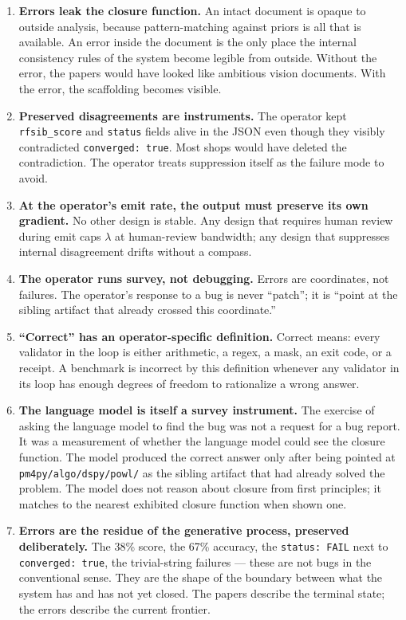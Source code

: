 \documentclass[11pt,letterpaper]{article}
\begin{document}
\begin{enumerate}[leftmargin=1.5em]
\item \textbf{Errors leak the closure function.} An intact document is opaque to outside analysis, because pattern-matching against priors is all that is available. An error inside the document is the only place the internal consistency rules of the system become legible from outside. Without the error, the papers would have looked like ambitious vision documents. With the error, the scaffolding becomes visible.
\item \textbf{Preserved disagreements are instruments.} The operator kept \texttt{rfsib\_score} and \texttt{status} fields alive in the JSON even though they visibly contradicted \texttt{converged: true}. Most shops would have deleted the contradiction. The operator treats suppression itself as the failure mode to avoid.
\item \textbf{At the operator's emit rate, the output must preserve its own gradient.} No other design is stable. Any design that requires human review during emit caps $\lambda$ at human-review bandwidth; any design that suppresses internal disagreement drifts without a compass.
\item \textbf{The operator runs survey, not debugging.} Errors are coordinates, not failures. The operator's response to a bug is never ``patch''; it is ``point at the sibling artifact that already crossed this coordinate.''
\item \textbf{``Correct'' has an operator-specific definition.} Correct means: every validator in the loop is either arithmetic, a regex, a mask, an exit code, or a receipt. A benchmark is incorrect by this definition whenever any validator in its loop has enough degrees of freedom to rationalize a wrong answer.
\item \textbf{The language model is itself a survey instrument.} The exercise of asking the language model to find the bug was not a request for a bug report. It was a measurement of whether the language model could see the closure function. The model produced the correct answer only after being pointed at \texttt{pm4py/algo/dspy/powl/} as the sibling artifact that had already solved the problem. The model does not reason about closure from first principles; it matches to the nearest exhibited closure function when shown one.
\item \textbf{Errors are the residue of the generative process, preserved deliberately.} The 38\% score, the 67\% accuracy, the \texttt{status: FAIL} next to \texttt{converged: true}, the trivial-string failures --- these are not bugs in the conventional sense. They are the shape of the boundary between what the system has and has not yet closed. The papers describe the terminal state; the errors describe the current frontier.
\end{enumerate}
\end{document}
